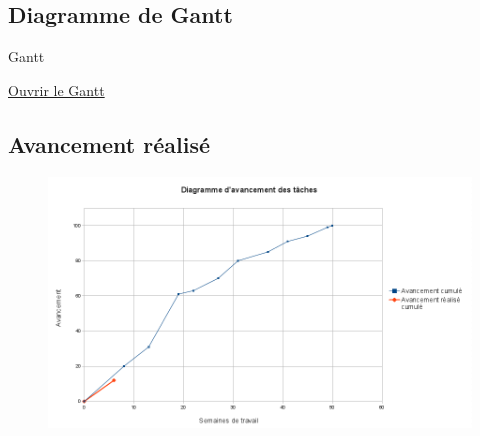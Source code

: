 \documentclass{beamer}
\begin{document}
	\subsection{Diagramme de Gantt}
	\begin{frame}{Gantt}
		\begin{center}
			\href{run:Gantt_ProjetDiscretConception.gif}{Ouvrir le Gantt}
		\end{center}
	\end{frame}

	\subsection{Avancement réalisé}
	\begin{frame}{\subsecname}
		\begin{figure}
			\includegraphics[width=12cm]{Avancement.png}
		\end{figure}
	\end{frame}


\end{document}
